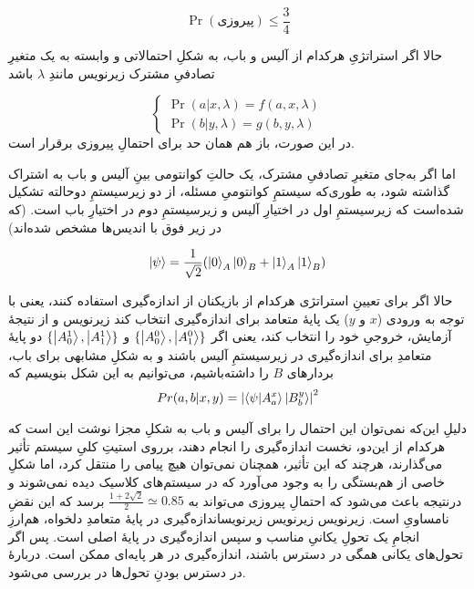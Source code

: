 \begin{equation}
    \label{معادله:بل-بازی}
    \Pr(\text{پیروزی}) \le \frac{3}{4}
\end{equation}

حالا اگر استراتژیِ هرکدام از آلیس و باب، به شکلِ احتمالاتی و وابسته به یک متغیرِ تصادفیِ مشترک ‌زیرنویس مانندِ 
\(\lambda\)
باشد

\begin{equation}
\begin{cases}
    \Pr(a | x, \lambda) = f(a, x, \lambda) \\
    \Pr(b | y, \lambda) = g(b, y, \lambda)
\end{cases}
\end{equation}
در این صورت، باز هم همان حد برای احتمالِ پیروزی برقرار است.

اما اگر به‌جای متغیرِ تصادفیِ مشترک، یک حالتِ کوانتومی بینِ آلیس و باب به اشتراک گذاشته شود، به طوری‌که سیستمِ کوانتومیِ مسئله، از دو زیرسیستمِ دوحالته تشکیل شده‌است که زیرسیستمِ اول در اختیارِ آلیس و زیرسیستمِ دوم در اختیارِ باب است. (که در زیر فوق با اندیس‌ها مشخص شده‌اند)

\begin{equation}
    \ket\psi = \frac{1}{\sqrt{2}} (\ket{0}_A\ket{0}_B + \ket{1}_A\ket{1}_B) 
\end{equation}

حالا اگر برای تعیینِ استراتژی هرکدام از بازیکنان از اندازه‌گیری استفاده کنند، یعنی با توجه به ورودی
(\(x\) و \(y\))
یک پایهٔ متعامد برای اندازه‌گیری انتخاب کند ‌زیرنویس و از نتیجهٔ آزمایش، خروجیِ خود را انتخاب کند، یعنی اگر
\( \{\ket{A^0_0}, \ket{A^0_1} \} \)
و 
\( \{\ket{A^1_0}, \ket{A^1_1} \} \)
دو پایهٔ متعامدِ برای اندازه‌گیری در زیرسیستمِ آلیس باشند و به شکلِ مشابهی برای باب، بردارهای 
\(B\)
را داشته‌باشیم، می‌توانیم به این شکل بنویسیم که
\begin{equation}
    Pr(a, b | x, y) = \abs{\bra\psi \ket{A^x_a} \ket{B^y_b}}^2
\end{equation}

دلیلِ این‌که نمی‌توان این احتمال را برای آلیس و باب به شکلِ مجزا نوشت این است که هرکدام از این‌دو، نخست اندازه‌گیری را انجام دهند، برروی استیتِ کلیِ سیستم تأثیر می‌گذارند، هرچند که این تأثیر، همچنان نمی‌توان هیچ پیامی را منتقل کرد، اما شکلِ خاصی از هم‌بستگی را به وجود می‌آورد که در سیستم‌های کلاسیک دیده نمی‌شوند و درنتیجه باعث می‌شود که احتمالِ پیروزی می‌تواند به 
\( \frac{1 + 2\sqrt{2}}{2} \simeq 0.85 \)
برسد که این نقضِ نامساویِ  است.
‌زیرنویس{}
‌زیرنویس{}
‌زیرنویس{اندازه‌گیری در پایهٔ متعامدِ دلخواه، هم‌ارزِ انجامِ یک تحولِ یکانیِ مناسب و سپس اندازه‌گیری در پایهٔ اصلی است. پس اگر تحول‌های یکانی همگی در دسترس باشند، اندازه‌گیری در هر پایه‌ای ممکن است. دربارهٔ در دسترس بودنِ تحول‌ها در  بررسی می‌شود.}

